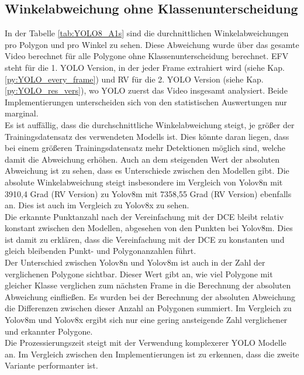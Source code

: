 \subsection{Winkelabweichung ohne Klassenunterscheidung}
{	
	In der Tabelle \ref{tab:YOLO8_A1s} sind die durchnittlichen Winkelabweichungen pro Polygon und pro Winkel zu sehen. Diese Abweichung wurde über das gesamte Video berechnet für alle Polygone ohne Klassenunterscheidung berechnet.  EFV steht für die 1. YOLO Version, in der jeder Frame extrahiert wird (siehe Kap. \ref{py:YOLO_every_frame}) und RV für die 2. YOLO Version (siehe Kap. \ref{py:YOLO_res_vers}), wo YOLO zuerst das Video insgesamt analysiert. Beide Implementierungen unterscheiden sich von den statistischen Auswertungen nur marginal.\\
	Es ist auffällig, dass die durchschnittliche  Winkelabweichung steigt, je größer der Trainingsdatensatz des verwendeten Modells ist. Dies könnte daran liegen, dass bei einem größeren Trainingsdatensatz mehr Detektionen möglich sind, welche damit  die Abweichung erhöhen. Auch an dem steigenden Wert der absoluten Abweichung ist zu sehen, dass es Unterschiede zwischen den Modellen gibt. Die absolute Winkelabweichung steigt insbesondere im Vergleich von Yolov8n mit 3910,4 Grad (RV Version) zu Yolov8m mit 7358,55 Grad (RV Version) ebenfalls an. Dies ist auch im Vergleich zu Yolov8x zu sehen. \\
	Die erkannte Punktanzahl nach der Vereinfachung mit der DCE bleibt relativ konstant zwischen den Modellen, abgesehen von den Punkten bei Yolov8m. Dies ist damit zu erklären, dass die Vereinfachung mit der DCE zu konstanten und gleich bleibenden Punkt- und Polygonanzahlen führt. \\
	Der Unterschied zwischen Yolov8n und Yolov8m ist auch in der Zahl der verglichenen Polygone sichtbar. Dieser Wert gibt an, wie viel Polygone mit gleicher Klasse verglichen zum nächsten Frame in die Berechnung der absoluten Abweichung einfließen. Es wurden bei der Berechnung der absoluten Abweichung die Differenzen zwischen dieser Anzahl an Polygonen summiert. Im Vergleich zu Yolov8m und Yolov8x ergibt sich nur eine gering ansteigende Zahl verglichener und erkannter Polygone. \\
	Die Prozessierungszeit steigt mit der Verwendung komplexerer YOLO Modelle an. Im Vergleich zwischen den Implementierungen ist zu erkennen, dass die zweite Variante performanter ist.
}
